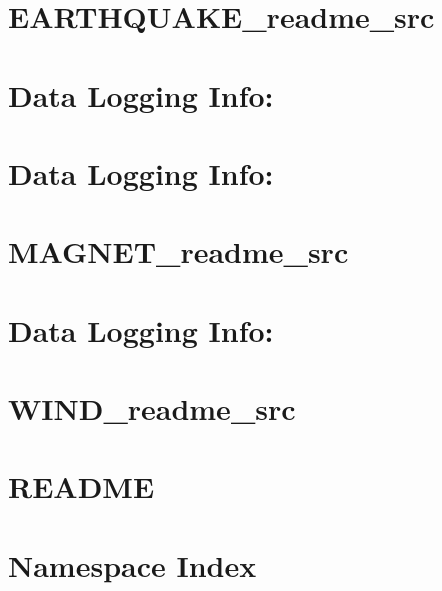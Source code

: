 \let\mypdfximage\pdfximage\def\pdfximage{\immediate\mypdfximage}\documentclass[twoside]{book}
\newcommand{\+}{\discretionary{\mbox{\scriptsize$\hookleftarrow$}}{}{}}
\begin{document}
\chapter{E\+A\+R\+T\+H\+Q\+U\+A\+K\+E\+\_\+readme\+\_\+src}
\label{md_doc_readme_src__e_a_r_t_h_q_u_a_k_e_readme_src}

\chapter{Data Logging Info\+:}
\label{md_doc_readme_src__j_o_w_i_l_d_e_r_readme_src}

\chapter{Data Logging Info\+:}
\label{md_doc_readme_src__l_a_k_e_l_a_n_d_readme_src}

\chapter{M\+A\+G\+N\+E\+T\+\_\+readme\+\_\+src}
\label{md_doc_readme_src__m_a_g_n_e_t_readme_src}

\chapter{Data Logging Info\+:}
\label{md_doc_readme_src__w_a_v_e_s_readme_src}

\chapter{W\+I\+N\+D\+\_\+readme\+\_\+src}
\label{md_doc_readme_src__w_i_n_d_readme_src}

\chapter{R\+E\+A\+D\+ME}
\label{md__r_e_a_d_m_e}

\chapter{Namespace Index}

\end{document}
